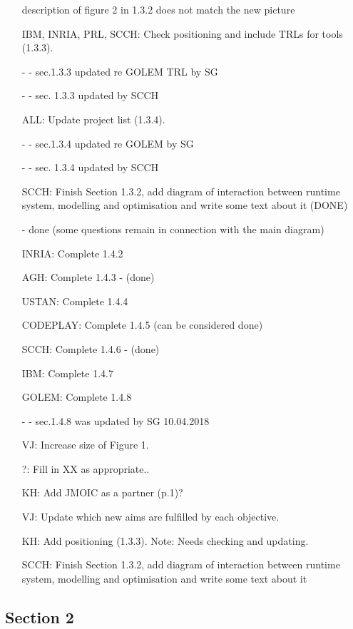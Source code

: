 \begin{itemize}
\item[] description of figure 2 in 1.3.2 does not match the new picture
\item[IBM, INRIA, PRL, SCCH:]
Check positioning and include TRLs for tools (1.3.3).
\item[-] - sec.1.3.3 updated re GOLEM TRL by SG
\item[-] - sec. 1.3.3 updated by SCCH
\item[ALL:]
Update project list (1.3.4).
\item[-] - sec.1.3.4 updated re GOLEM by SG
\item[-] - sec. 1.3.4 updated by SCCH
\item[SCCH:]
Finish Section 1.3.2, add diagram of interaction between runtime system, modelling and optimisation and write some text about it (DONE)
\item[-] done (some questions remain in connection with the main diagram)
\item[INRIA:]
Complete 1.4.2
\item[AGH:]
Complete 1.4.3 - (done)
\item[USTAN:]
Complete 1.4.4
\item[CODEPLAY:]
Complete 1.4.5 (can be considered done)
\item[SCCH:]
Complete 1.4.6 - (done)
\item[IBM:]
Complete 1.4.7
\item[GOLEM:]
Complete 1.4.8
\item[-] - sec.1.4.8 was updated by SG 10.04.2018
\item[VJ:]
Increase size of Figure 1.
\item[?:]
Fill in XX as appropriate..
\item[KH:]
Add JMOIC as a partner (p.1)?
\item[VJ:]
Update which new aims are fulfilled by each objective.
\item[KH:]
Add positioning (1.3.3). Note: Needs checking and updating.
\item[SCCH:]
Finish Section 1.3.2, add diagram of interaction between runtime system, modelling and optimisation and write some text about it
\end{itemize}

\subsection*{Section 2}

